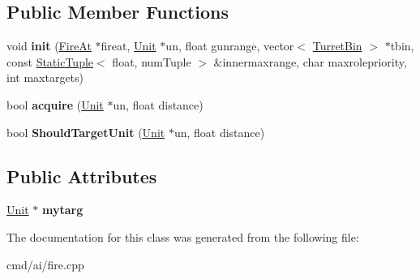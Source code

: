 \subsection*{Public Member Functions}
\begin{DoxyCompactItemize}
\item 
void {\bfseries init} (\hyperlink{classOrders_1_1FireAt}{Fire\+At} $\ast$fireat, \hyperlink{classUnit}{Unit} $\ast$un, float gunrange, vector$<$ \hyperlink{structTurretBin}{Turret\+Bin} $>$ $\ast$tbin, const \hyperlink{classStaticTuple}{Static\+Tuple}$<$ float, num\+Tuple $>$ \&innermaxrange, char maxrolepriority, int maxtargets)\hypertarget{classChooseTargetClass_a948de64675462c4393319f1ccc57b866}{}\label{classChooseTargetClass_a948de64675462c4393319f1ccc57b866}

\item 
bool {\bfseries acquire} (\hyperlink{classUnit}{Unit} $\ast$un, float distance)\hypertarget{classChooseTargetClass_ae2de930c3bdfb8ca67443d37c08cebb4}{}\label{classChooseTargetClass_ae2de930c3bdfb8ca67443d37c08cebb4}

\item 
bool {\bfseries Should\+Target\+Unit} (\hyperlink{classUnit}{Unit} $\ast$un, float distance)\hypertarget{classChooseTargetClass_aa47453eb20790f9fa1f2628079ee2f2c}{}\label{classChooseTargetClass_aa47453eb20790f9fa1f2628079ee2f2c}

\end{DoxyCompactItemize}
\subsection*{Public Attributes}
\begin{DoxyCompactItemize}
\item 
\hyperlink{classUnit}{Unit} $\ast$ {\bfseries mytarg}\hypertarget{classChooseTargetClass_a64ab66481cf4687cea4967ab792dc4d9}{}\label{classChooseTargetClass_a64ab66481cf4687cea4967ab792dc4d9}

\end{DoxyCompactItemize}


The documentation for this class was generated from the following file\+:\begin{DoxyCompactItemize}
\item 
cmd/ai/fire.\+cpp\end{DoxyCompactItemize}
